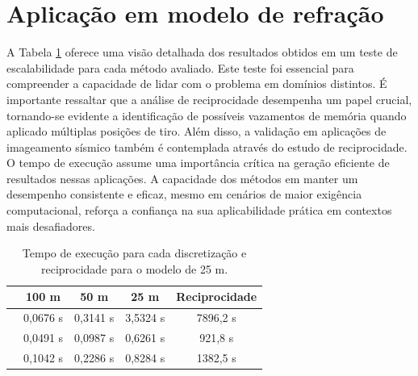 \section{Aplicação em modelo de refração}

A Tabela \ref{table_refModel} oferece uma visão detalhada dos resultados obtidos em um teste de escalabilidade para cada método avaliado. Este teste foi essencial para compreender a capacidade de lidar com o problema em domínios distintos. É importante ressaltar que a análise de reciprocidade desempenha um papel crucial, tornando-se evidente a identificação de possíveis vazamentos de memória quando aplicado múltiplas posições de tiro. Além disso, a validação em aplicações de imageamento sísmico também é contemplada através do estudo de reciprocidade. O tempo de execução assume uma importância crítica na geração eficiente de resultados nessas aplicações. A capacidade dos métodos em manter um desempenho consistente e eficaz, mesmo em cenários de maior exigência computacional, reforça a confiança na sua aplicabilidade prática em contextos mais desafiadores. 

\begin{table}[H]
	\caption{Tempo de execução para cada discretização e reciprocidade para o modelo de 25 m.}
	\begin{tabular}{r|cccc}
		& 100 m    & 50 m     & 25 m     & Reciprocidade \\ \hline
		\citeonline{podvin1991finite}   & 0,0676 s & 0,3141 s & 3,5324 s & 7896,2 s        \\ \hline
		\citeonline{jeong2008fast} & 0,0491 s & 0,0987 s & 0,6261 s & 921,8 s              \\ \hline
		\citeonline{noble2014accurate} & 0,1042 s & 0,2286 s & 0,8284 s & 1382,5 s          \\
	\end{tabular}
	\label{table_refModel}
\end{table}

